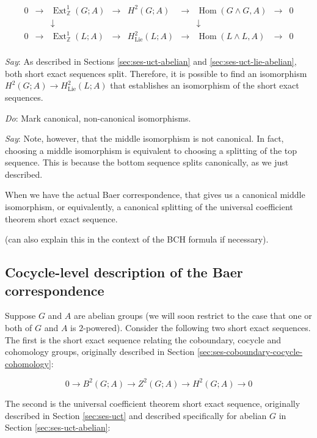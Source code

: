 \documentclass[10pt]{amsart}
\begin{document}
$$\begin{array}{ccccccccc}
  0 &\to &\operatorname{Ext}^1_{\mathbb{Z}}(G;A) &\to &H^2(G;A) &\to &\operatorname{Hom}(G \wedge G,A) &\to &0\\
  & & \downarrow & & & & \downarrow & & \\
  0 &\to &\operatorname{Ext}^1_{\mathbb{Z}}(L;A) & \to & H^2_{\text{Lie}}(L;A) & \to & \operatorname{Hom}(L \wedge L, A) & \to & 0\\
\end{array}$$

{\em Say}: As described in Sections \ref{sec:ses-uct-abelian} and
\ref{sec:ses-uct-lie-abelian}, both short exact sequences
split. Therefore, it is possible to find an isomorphism $H^2(G;A) \to
H^2_{\text{Lie}}(L;A)$ that establishes an isomorphism of the short
exact sequences.

{\em Do}: Mark canonical, non-canonical isomorphisms.

{\em Say}: Note, however, that the middle isomorphism is not
canonical. In fact, choosing a middle isomorphism is equivalent to
choosing a splitting of the top sequence. This is because the bottom
sequence splits canonically, as we just described.

When we have the actual Baer correspondence, that gives us a canonical
middle isomorphism, or equivalently, a canonical splitting of the
universal coefficient theorem short exact sequence.

(can also explain this in the context of the BCH formula if necessary).

\subsection{Cocycle-level description of the Baer correspondence}\label{sec:baer-correspondence-cocycle-level}

Suppose $G$ and $A$ are abelian groups (we will soon restrict to the
case that one or both of $G$ and $A$ is $2$-powered). Consider the
following two short exact sequences. The first is the short exact
sequence relating the coboundary, cocycle and cohomology groups,
originally described in Section
\ref{sec:ses-coboundary-cocycle-cohomology}:

$$0 \to B^2(G;A) \to Z^2(G;A) \to H^2(G;A) \to 0$$

The second is the universal coefficient theorem short exact sequence,
originally described in Section \ref{sec:ses-uct} and described
specifically for abelian $G$ in Section \ref{sec:ses-uct-abelian}:
\end{document}

